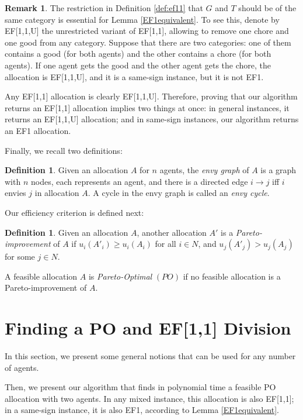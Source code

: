\documentclass[sigconf]{aamas}
\theoremstyle{definition}
\newtheorem{definition}[theorem]{Definition}
\newtheorem{remark}[theorem]{Remark}
\begin{document}
\begin{remark}
The restriction in Definition \ref{def:ef11} that $G$ and $T$ should be of the same category is essential for Lemma \ref{EF1equivalent}. 
To see this, denote by EF[1,1,U] the unrestricted variant of EF[1,1], allowing to remove one chore and one good from any category.
Suppose that there are two categories: one of them contains a good (for both agents) and the other contains a chore (for both agents). If one agent gets the good and the other agent gets the chore, the allocation is EF[1,1,U], and it is a same-sign instance, but it is not EF1.

Any EF[1,1] allocation is clearly EF[1,1,U]. Therefore, proving that our algorithm returns an EF[1,1] allocation implies two things at once: in general instances, it returns an EF[1,1,U] allocation;
and in same-sign instances, our algorithm returns an EF1 allocation.
\end{remark}



Finally, we recall two definitions:
\begin{definition}
Given an allocation $A$ for $n$ agents, the \emph{envy graph} of $A$ is a graph with $n$ nodes, each represents an agent, and there is a directed edge $i\rightarrow j$ iff $i$ envies $j$ in allocation $A$.
A cycle in the envy graph is called an \emph{envy cycle}. 
\end{definition}

Our efficiency criterion is defined next:

\begin{definition}
Given an allocation $A$, another allocation $A'$ is a \textit{Pareto-improvement} of $A$ if $u_i(A'_i) \geq u_i(A_i)$ for all $i \in N$, and $u_j(A'_j) > u_j(A_j)$ for some $j \in N$.

A feasible allocation $A$ is \textit{Pareto-Optimal} $(PO)$ if no feasible allocation is a Pareto-improvement of $A$.
\end{definition}

\section{Finding a PO and EF[1,1] Division}
In this section, we present some general notions that can be used for any number of agents.

Then, we present our algorithm that finds in polynomial time a feasible PO allocation with two agents.
In any mixed instance, this allocation is also EF[1,1]; in a same-sign instance, it is also EF1, according to Lemma \ref{EF1equivalent}.
\end{document}
